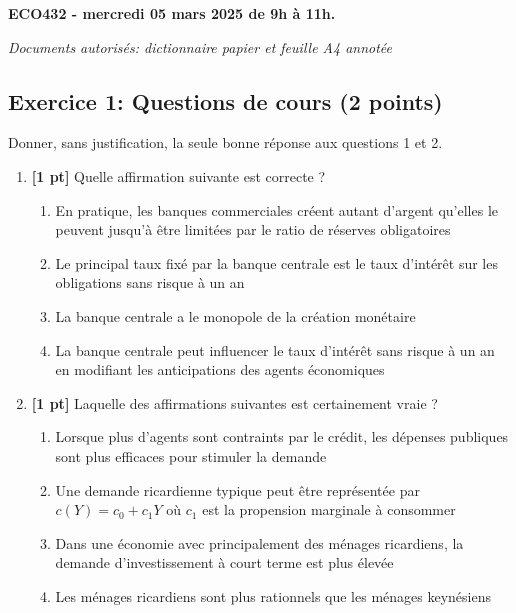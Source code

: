 \documentclass[a4paper,12pt]{article}
\begin{document}
\begin{center}
    \large
\textbf{ECO432 - mercredi 05 mars 2025 de 9h à 11h.}

\emph{Documents autorisés: dictionnaire papier et feuille A4 annotée}
\end{center}


\subsection*{Exercice 1: Questions de cours (2 points)}

Donner, sans justification, la seule bonne réponse aux questions 1 et 2. 

\begin{enumerate}
\item \textbf{[1 pt]} Quelle affirmation suivante est correcte ?
    \begin{enumerate}
        \item En pratique, les banques commerciales créent autant d'argent qu'elles le peuvent jusqu'à être limitées par le ratio de réserves obligatoires
        \item Le principal taux fixé par la banque centrale est le taux d'intérêt sur les obligations sans risque à un an
        \item La banque centrale a le monopole de la création monétaire
        \item La banque centrale peut influencer le taux d'intérêt sans risque à un an en modifiant les anticipations des agents économiques
    \end{enumerate}
\item \textbf{[1 pt]} Laquelle des affirmations suivantes est certainement vraie ?
\begin{enumerate}
    \item Lorsque plus d'agents sont contraints par le crédit, les dépenses publiques sont plus efficaces pour stimuler la demande
    \item Une demande ricardienne typique peut être représentée par $c(Y) = c_0 + c_1 Y$ où $c_1$ est la propension marginale à consommer
    \item Dans une économie avec principalement des ménages ricardiens, la demande d'investissement à court terme est plus élevée
    \item Les ménages ricardiens sont plus rationnels que les ménages keynésiens
\end{enumerate}

\end{enumerate}
\end{document}
